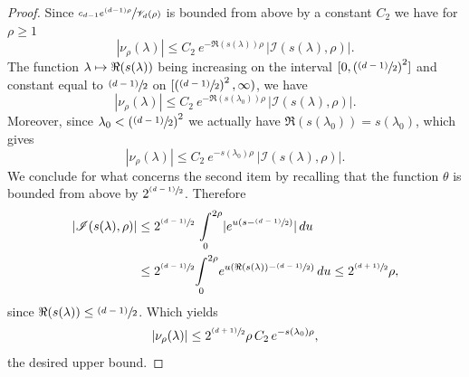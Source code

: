 \documentclass[JEP,XML,SOM,Unicode,NoFloatCountersInSection,published]{cedram}
\let\mathcal\mathscr
\newcommand{\psfrac}[2]{\sfrac{(#1)}{#2}}
\def\mto{\mathchoice{\longmapsto}{\mapsto}{\mapsto}{\mapsto}}
\theoremstyle{plain}
\theoremstyle{definition}
\newcommand{\inte}[1]{\underset{#1}{\int}}
\begin{document}
\begin{proof}
Since $\sfrac{c_{d-1} e^{(d-1)\rho}}{\mathcal{V}_d(\rho)}$ is bounded from above by a constant $C_2$ we have for $\rho \ge 1$
\[
| \nu_{\rho}(\lambda)| \le C_2 \ e^{ - \Re(s(\lambda)) \rho } \, | \mathcal{I}(s(\lambda),\rho) |.
\]
The function $ \lambda \mto \Re(s(\lambda))$ being increasing on the interval $[0,\left(\psfrac{d-1}{2}\right)^2]$ and constant equal to $\psfrac{d-1}{2}$ on $[\left(\psfrac{d-1}{2}\right)^2,\infty)$, we have
\[
| \nu_{\rho}(\lambda)| \le C_2 \ e^{ - \Re(s(\lambda_0)) \rho } \, | \mathcal{I}(s(\lambda),\rho) |.
\]
Moreover, since $\lambda_0 < \left(\psfrac{d-1}{2}\right)^2$ we actually have $\Re(s(\lambda_0)) = s(\lambda_0)$, which gives
\[
|\nu_{\rho}(\lambda)| \le C_2 \ e^{ - s(\lambda_0) \rho } \ | \mathcal{I}(s(\lambda),\rho) |.
\]
We conclude for what concerns the second item by recalling that the function $\theta$ is bounded from above by $2^{ \psfrac{d-1}{2}}$. Therefore
\begin{align*}
| \mathcal{I}(s(\lambda),\rho) | & \le 2^{ \psfrac{d-1}{2}} \ \inte{0}^{2\rho} | e^{u \left(s - \psfrac{d-1}{2} \right)} | \,du \\
& \le 2^{ \psfrac{d-1}{2}} \inte{0}^{2\rho} e^{u \left(\Re(s(\lambda)) - \psfrac{d-1}{2} \right)} \,du \le 2^{ \psfrac{d+1}{2}} \rho,
\end{align*}
since $\Re(s(\lambda)) \le \psfrac{d-1}{2}$. Which yields
\[
|\nu_{\rho}(\lambda)| \le 2^{ \psfrac{d+1}{2}} \rho \, C_2 \, e^{ - s(\lambda_0) \rho},
\]
the desired upper bound.


\end{proof}
\end{document}
